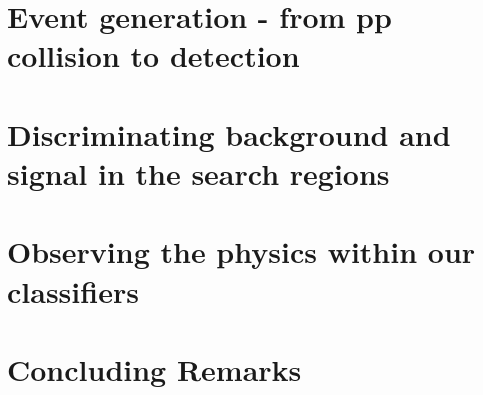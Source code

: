 \documentclass[12pt,a4paper]{report}
\begin{document}
\chapter{Event generation - from pp collision to detection}
\label{chap:5}




\chapter{Discriminating background and signal in the search regions}
\label{chap:6}


\chapter{Observing the physics within our classifiers}
\label{chap:7}



\chapter{Concluding Remarks}


\clearpage





\end{document}
